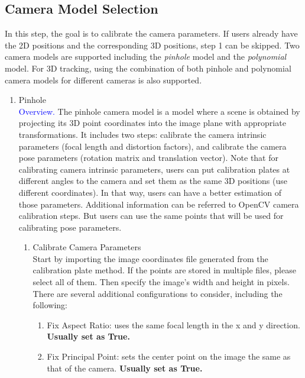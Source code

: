 \documentclass[a4paper,fleqn]{article}
\begin{document}
\subsection{Camera Model Selection}

In this step, the goal is to calibrate the camera parameters. If users already have the 2D positions and the corresponding 3D positions, step 1 can be skipped. Two camera models are supported including the \textit{pinhole} model and the \textit{polynomial} model. For 3D tracking, using the combination of both pinhole and polynomial camera models for different cameras is also supported. 

\begin{enumerate}
    \item Pinhole\\ 
    \textcolor{blue}{Overview. }The pinhole camera model is a model where a scene is obtained by projecting its 3D point coordinates into the image plane with appropriate transformations. It includes two steps: calibrate the camera intrinsic parameters (focal length and distortion factors), and calibrate the camera pose parameters (rotation matrix and translation vector).
    Note that for calibrating camera intrinsic parameters, users can put calibration plates at different angles to the camera and set them as the same 3D positions (use different coordinates). In that way, users can have a better estimation of those parameters. Additional information can be referred to OpenCV camera calibration steps. But users can use the same points that will be used for calibrating pose parameters.

    \begin{enumerate}
        \item Calibrate Camera Parameters\\
        Start by importing the image coordinates file generated from the calibration plate method. If the points are stored in multiple files, please select all of them. Then specify the image's width and height in pixels. There are several additional configurations to consider, including the following:
        \begin{enumerate}
            \item Fix Aspect Ratio: uses the same focal length in the x and y direction. \textbf{Usually set as True.}

            \item Fix Principal Point: sets the center point on the image the same as that of the camera. \textbf{Usually set as True.}


\end{enumerate}
\end{enumerate}
\end{enumerate}
\end{document}
